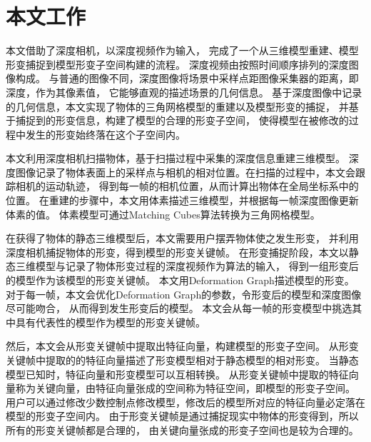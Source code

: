 
\section{本文工作}
本文借助了深度相机，以深度视频作为输入，
完成了一个从三维模型重建、模型形变捕捉到模型形变子空间构建的流程。
深度视频由按照时间顺序排列的深度图像构成。
与普通的图像不同，深度图像将场景中采样点距图像采集器的距离，即深度，作为其像素值，
它能够直观的描述场景的几何信息。
基于深度图像中记录的几何信息，本文实现了物体的三角网格模型的重建以及模型形变的捕捉，
并基于捕捉到的形变信息，构建了模型的合理的形变子空间，
使得模型在被修改的过程中发生的形变始终落在这个子空间内。

本文利用深度相机扫描物体，基于扫描过程中采集的深度信息重建三维模型。
深度图像记录了物体表面上的采样点与相机的相对位置。在扫描的过程中，本文会跟踪相机的运动轨迹，
得到每一帧的相机位置，从而计算出物体在全局坐标系中的位置。
在重建的步骤中，本文用体素描述三维模型，并根据每一帧深度图像更新体素的值。
体素模型可通过Matching Cubes\cite{lorensen1987marching}算法转换为三角网格模型。

在获得了物体的静态三维模型后，本文需要用户摆弄物体使之发生形变，
并利用深度相机捕捉物体的形变，得到模型的形变关键帧。
在形变捕捉阶段，本文以静态三维模型与记录了物体形变过程的深度视频作为算法的输入，
得到一组形变后的模型作为该模型的形变关键帧。
本文用Deformation Graph\cite{sumner2007embedded}描述模型的形变。
对于每一帧，本文会优化Deformation Graph的参数，令形变后的模型和深度图像尽可能吻合，
从而得到发生形变后的模型。
本文会从每一帧的形变模型中挑选其中具有代表性的模型作为模型的形变关键帧。

然后，本文会从形变关键帧中提取出特征向量，构建模型的形变子空间。
从形变关键帧中提取的的特征向量描述了形变模型相对于静态模型的相对形变。
当静态模型已知时，特征向量和形变模型可以互相转换。
从形变关键帧中提取的特征向量称为关键向量，由特征向量张成的空间称为特征空间，即模型的形变子空间。
用户可以通过修改少数控制点修改模型，修改后的模型所对应的特征向量必定落在模型的形变子空间内。
由于形变关键帧是通过捕捉现实中物体的形变得到，所以所有的形变关键帧都是合理的，
由关键向量张成的形变子空间也是较为合理的。


